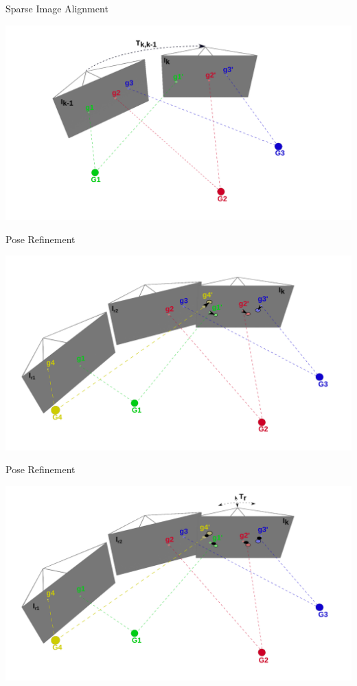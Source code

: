 \documentclass[aspectratio=169]{beamer}
\begin{document}
\begin{frame}{Sparse Image Alignment}
  \begin{center}
    \includegraphics[height=0.9\textheight]{../img/pose_estimation_sparse.png}
  \end{center}
\end{frame}

\begin{frame}{Pose Refinement}
  \begin{center}
    \includegraphics[height=0.9\textheight]{../img/pose_estimation_opt_flow.png}
  \end{center}
\end{frame}

\begin{frame}{Pose Refinement}
  \begin{center}
    \includegraphics[height=0.9\textheight]{../img/pose_estimation_refinement.png}
  \end{center}
\end{frame}
\end{document}
